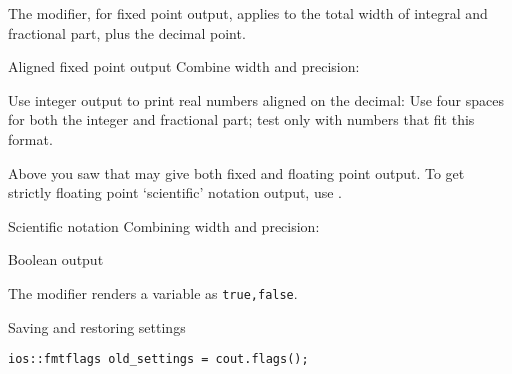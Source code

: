 The  modifier, for fixed point output,
applies to the total width of integral and fractional part,
plus the decimal point.

\begin{block}{Aligned fixed point output}
  \label{sl:io-align}
  Combine width and precision:
\end{block}

\begin{exercise}
  \label{ex:fixedpout}
  Use integer output to print real numbers aligned on the
  decimal:
  Use four spaces for both the integer and fractional part; test only
  with numbers that fit this format.
\end{exercise}

Above you saw that  may give both fixed and floating point
output. To get strictly floating point `scientific' notation output,
use .

\begin{block}{Scientific notation}
  \label{sl:io-sci}
  Combining width and precision:
  
\end{block}

\begin{comment}
\begin{verbatim}
cout << "Combine width and precision:" << "\n";
x = 1.234567;
cout << scientific;
for (int i=0; i<10; i++) {
  cout << setw(10) << setprecision(4) << x << "\n";
  x *= 10;
}
\end{verbatim}
\begin{block}{Output}
  \label{sl:io-sci-out}
\begin{verbatim}
Combine width and precision:
1.2346e+00
1.2346e+01
1.2346e+02
1.2346e+03
1.2346e+04
1.2346e+05
1.2346e+06
1.2346e+07
1.2346e+08
1.2346e+09
\end{verbatim}
\end{block}
\end{comment}

 {Boolean output}
\label{sec:boolalpha}

The  modifier renders a  variable
as \lstinline{true,false}.

 {Saving and restoring settings}

\begin{verbatim}
ios::fmtflags old_settings = cout.flags();
\end{verbatim}

